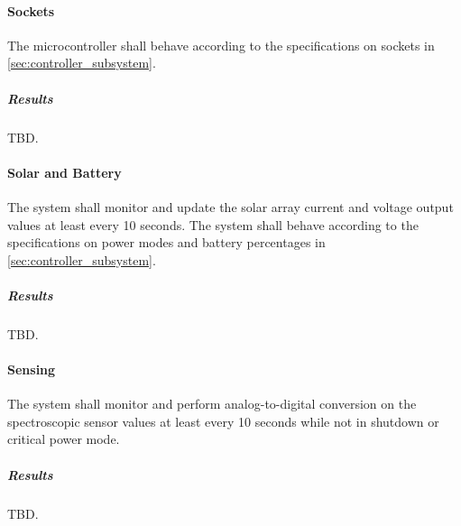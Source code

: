 \paragraph{Sockets} The microcontroller shall behave according to the specifications on sockets in \autoref{sec:controller_subsystem}.
\subparagraph{Results} TBD.

\paragraph{Solar and Battery} The system shall monitor and update the solar array current and voltage output values at least every 10 seconds. The system shall behave according to the specifications on power modes and battery percentages in \autoref{sec:controller_subsystem}.
\subparagraph{Results} TBD.

\paragraph{Sensing} The system shall monitor and perform analog-to-digital conversion on the spectroscopic sensor values at least every 10 seconds while not in shutdown or critical power mode.
\subparagraph{Results} TBD.